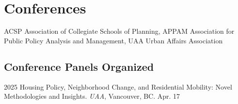 \documentclass[11pt,letterpaper]{article}
\begin{document}
\section{Conferences}
ACSP Association of Collegiate Schools of Planning, APPAM Association for Public Policy Analysis and Management, UAA Urban Affairs Association

\subsection{Conference Panels Organized}
\begin{tablist}
  \item[2025] \tab{}Housing Policy, Neighborhood Change, and Residential Mobility: Novel Methodologies and Insights. \emph{UAA}, Vancouver, BC. Apr. 17
\end{tablist}
\end{document}
